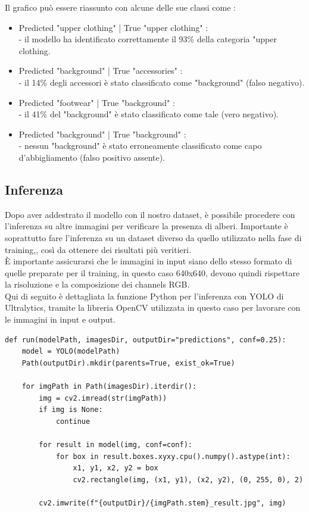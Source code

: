 \noindent
Il grafico può essere riassunto con alcune delle sue classi come :

\begin{itemize}
    \item Predicted "upper clothing" | True "upper clothing" : \\
        - il modello ha identificato correttamente il 93\% della categoria "upper clothing.
    \item Predicted "background" | True "accessories" : \\
        - il 14\% degli accessori è stato classificato come "background" (falso negativo).
    \item Predicted "footwear" | True "background" : \\
        - il 41\% del "background" è stato classificato come tale (vero negativo).
    \item Predicted "background" | True "background" : \\
        - nessun "background" è stato erroneamente classificato come capo d'abbigliamento (falso positivo assente).
\end{itemize}

\newpage

\subsection{Inferenza}

Dopo aver addestrato il modello con il nostro dataset, è possibile procedere con l'inferenza su altre immagini per verificare la presenza di alberi. Importante è soprattutto fare l'inferenza su un dataset diverso da quello utilizzato nella fase di training,, così da ottenere dei risultati più veritieri. \\
\noindent
È importante assicurarsi che le immagini in input siano dello stesso formato di quelle preparate per il training, in questo caso 640x640, devono quindi rispettare la risoluzione e la composizione dei channels RGB. \\

\noindent
Qui di seguito è dettagliata la funzione Python per l'inferenza con YOLO di Ultralytics, tramite la libreria OpenCV utilizzata in questo caso per lavorare con le immagini in input e output. \\

\begin{lstlisting}
def run(modelPath, imagesDir, outputDir="predictions", conf=0.25):
    model = YOLO(modelPath)
    Path(outputDir).mkdir(parents=True, exist_ok=True)

    for imgPath in Path(imagesDir).iterdir():
        img = cv2.imread(str(imgPath))
        if img is None:
            continue

        for result in model(img, conf=conf):
            for box in result.boxes.xyxy.cpu().numpy().astype(int):
                x1, y1, x2, y2 = box
                cv2.rectangle(img, (x1, y1), (x2, y2), (0, 255, 0), 2)

        cv2.imwrite(f"{outputDir}/{imgPath.stem}_result.jpg", img)
\end{lstlisting}

